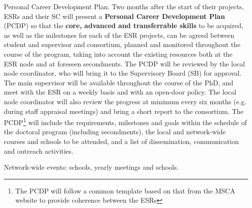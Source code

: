 \noindent \color{blue}Personal Career Development Plan. \color{black}
Two months after the start of their projects, ESRs and their SC will present a \textbf{Personal Career Development Plan} (PCDP) so that the \textbf{core, advanced and transferrable skills} to be acquired, as well as the milestones for each of the ESR projects, can be agreed between student and supervisor and consortium, planned and monitored throughout the course of the program, taking into account the existing resources both at the ESR node and at foreseen secondments. The PCDP will be reviewed by the local node coordinator, who will bring it to the Supervisory Board (SB) for approval. The main supervisor will be available throughout the course of the PhD, and meet with the ESR on a weekly basis and with an open-door policy. 
The local node coordinator will also review the progress at minimum every six months (e.g. during staff appraisal meetings) and bring a short report to the consortium. 
The PCDP\footnote{The \acronym PCDP will follow a common template based on that from the MSCA website to provide coherence between the ESRs} will include the requirements, milestones and goals within the schedule of the doctoral program (including secondments), the local and network-wide courses and schools to be attended, and a list of dissemination, communication and outreach activities. 



\noindent \color{blue}Network-wide events: schools, yearly meetings and schools. \color{black}

